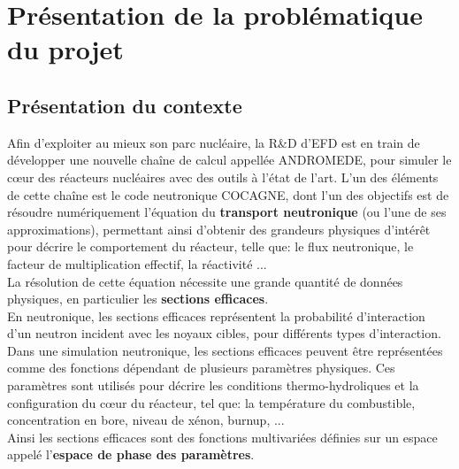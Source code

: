 \newpage
\section{Présentation de la problématique du projet}\label{sec:3}

\subsection{Présentation du contexte}\label{sec:3.1}
\hspace{0.5cm}
Afin d'exploiter au mieux son parc nucléaire, la R\&D d'EFD est en train de développer
une nouvelle chaîne de calcul appellée ANDROMEDE, pour simuler le cœur des réacteurs
nucléaires avec des outils à l'état de l'art. L'un des éléments de cette chaîne est le code
neutronique COCAGNE, dont l'un des objectifs est de résoudre numériquement l'équation du
\textbf{transport neutronique} (ou l'une de ses approximations), permettant ainsi d'obtenir des
grandeurs physiques d'intérêt pour décrire le comportement du réacteur, telle que:
le flux neutronique, le facteur de multiplication effectif, la réactivité ... \\
La résolution de cette équation nécessite une grande quantité de données physiques,
en particulier les \textbf{sections efficaces}. \\

En neutronique, les sections efficaces représentent la probabilité d'interaction d'un
neutron incident avec les noyaux cibles, pour différents types d'interaction. Dans une
simulation neutronique, les sections efficaces peuvent être représentées comme des fonctions
dépendant de plusieurs paramètres physiques. Ces paramètres sont utilisés pour décrire les
conditions thermo-hydroliques et la configuration du cœur du réacteur, tel que: la température
du combustible, concentration en bore, niveau de xénon, burnup, ... \\
Ainsi les sections efficaces sont des fonctions multivariées définies sur un espace appelé l'\textbf{espace de phase
des paramètres}. \\

